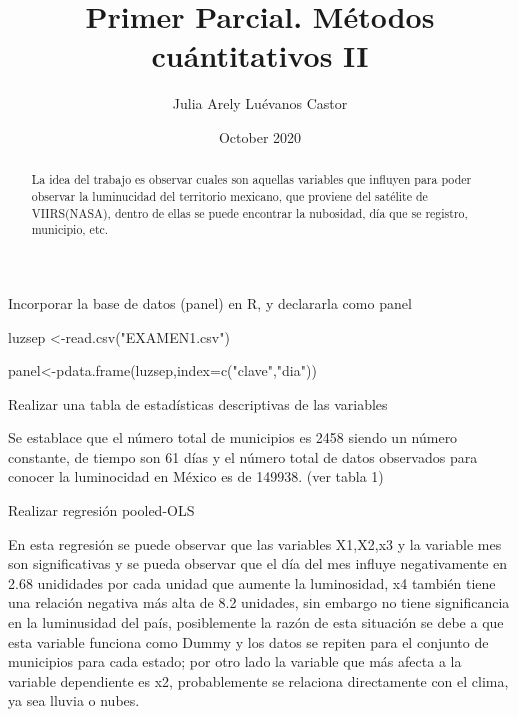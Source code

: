 \documentclass[letterpapper,12pt]{article}
\title{Primer Parcial. Métodos cuántitativos II}
\author{Julia Arely Luévanos Castor}
\date{October 2020}
\begin{document}
\maketitle
\begin{abstract}
La idea del trabajo es observar cuales son aquellas variables que influyen  para poder observar la luminucidad del territorio mexicano, que proviene del satélite de VIIRS(NASA), dentro de ellas se puede encontrar la nubosidad, día que se registro, municipio, etc. 
\end{abstract}
\begin{section}{Incorporar la base de datos (panel) en R, y declararla como panel} 

luzsep <-read.csv("EXAMEN1.csv")


panel<-pdata.frame(luzsep,index=c("clave","dia"))

\end{section}



\begin{section}{Realizar una tabla de estadísticas descriptivas de las variables}




Se establace que el número total de municipios es 2458 siendo un número constante, de tiempo son 61 días y el número total de datos observados para conocer la luminocidad en México es de 149938. (ver tabla 1)

\end{section}
\begin{section}{Realizar regresión pooled-OLS}

En esta regresión se puede observar que las variables X1,X2,x3 y la variable mes son significativas y se pueda observar que el día del mes influye negativamente en 2.68 unididades por cada unidad que aumente la luminosidad, x4 también tiene una relación negativa más alta de 8.2 unidades, sin embargo no tiene significancia en la luminusidad del país, posiblemente la razón de esta situación se debe a que esta variable funciona como Dummy y los datos se repiten para el conjunto de municipios para cada estado; por otro lado la variable que más afecta a la variable dependiente es x2, probablemente se relaciona directamente con el clima, ya sea lluvia o nubes.

\end{section}
\end{document}
